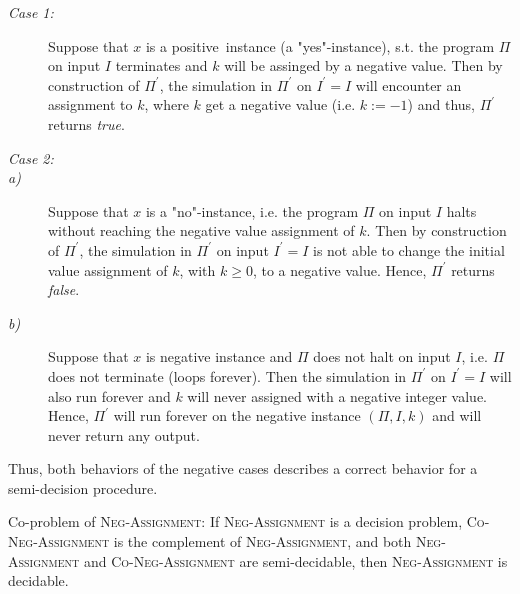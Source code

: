 \begin{description}
\item[\normalfont\slshape Case 1:] Suppose that $x$ is a positive\ instance
(a "yes"-instance), s.t. the program $\Pi $ on input $I$ terminates and $k$
will be assinged by a negative value. Then by construction of $\Pi ^{\prime
} $, the simulation in $\Pi ^{\prime }$ on $I^{\prime }=I$ will encounter an
assignment to $k$, where $k$ get a negative value (i.e. $k:=-1$) and thus, $%
\Pi ^{\prime }$ returns \textit{true}.

\item[\normalfont\slshape Case 2:] 

\item[\textit{a)}] Suppose that $x$ is a "no"-instance, i.e. the program $\Pi $ on
input $I$ halts without reaching the negative value assignment of $k$. Then
by construction of $\Pi ^{\prime }$, the simulation in $\Pi ^{\prime }$ on
input $I^{\prime }=I$ is not able to change the initial value assignment of $%
k$, with $k\geq 0$, to a negative value. Hence, $\Pi ^{\prime }$ returns 
\textit{false}.

\item[\textit{b)}] Suppose that $x$ is negative instance and $\Pi $ does not halt on
input $I$, i.e. $\Pi $ does not terminate (loops forever). Then the
simulation in $\Pi ^{\prime }$ on $I^{\prime }=I$ will also run forever and $%
k$ will never assigned with a negative integer value. Hence, $\Pi ^{\prime }$
will run forever on the negative instance $(\Pi ,I,k)$ and will never return
any output.
\end{description}

Thus, both behaviors of the negative cases describes a correct behavior for
a semi-decision procedure.

\medskip 

Co-problem of \textsc{Neg-Assignment}:
If \textsc{Neg-Assignment} is a decision problem, \textsc{Co-Neg-Assignment} 
is the complement of \textsc{Neg-Assignment}, and both \textsc{Neg-Assignment} 
and \textsc{Co-Neg-Assignment} are semi-decidable, then \textsc{Neg-Assignment} 
is decidable.


\bigskip 

